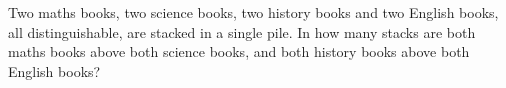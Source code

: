 Two maths books, two science books, two history books and two English books, all distinguishable, are stacked in a single pile. In how many stacks are both maths books above both science books, and both history books above both English books?
